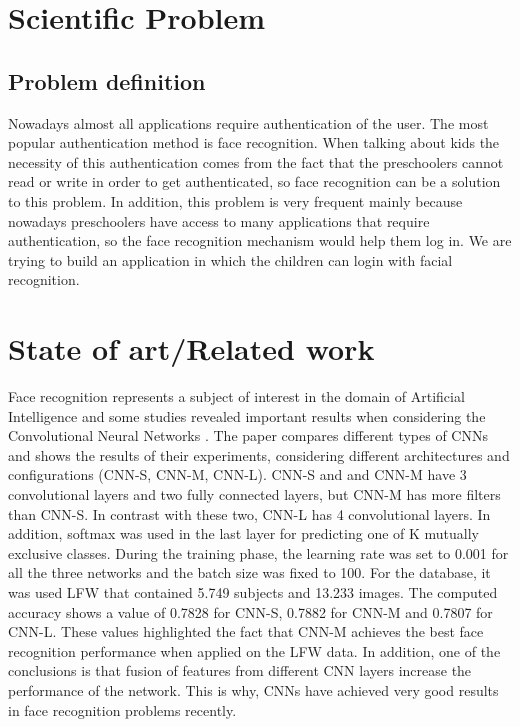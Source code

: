 \documentclass[runningheads,a4paper,11pt]{report}
\begin{document}
\chapter{Scientific Problem}
\label{section:scientificProblem}


\section{Problem definition}
\label{section:problemDefinition}
Nowadays almost all applications require authentication of the user. The most popular authentication method is face recognition. When talking about kids the necessity of this authentication comes from the fact that the preschoolers cannot read or write in order to get authenticated, so face recognition can be a solution to this problem. In addition, this problem is very frequent mainly because nowadays preschoolers have access to many applications that require authentication, so the face recognition mechanism would help them log in.
We are trying to build an application in which the children can login with facial recognition.



\chapter{State of art/Related work}
\label{chapter:stateOfArt}

Face recognition represents a subject of interest in the domain of Artificial Intelligence and some studies revealed important results when considering the Convolutional Neural Networks \cite{hu2015face}. The paper compares different types of CNNs and shows the results of their experiments, considering different architectures and configurations (CNN-S, CNN-M, CNN-L). CNN-S and and CNN-M have 3 convolutional layers and two fully connected layers, but CNN-M has more filters than CNN-S. In contrast with these two, CNN-L has 4 convolutional layers.  In addition, softmax was used in the last layer for predicting one of K mutually exclusive classes. During the training phase, the learning rate was set to 0.001 for all the three networks and the batch size was fixed to 100. For the database, it was used LFW that contained 5.749 subjects and 13.233 images. The computed accuracy shows a value of 0.7828 for CNN-S, 0.7882 for CNN-M and 0.7807 for CNN-L. These values highlighted the fact that CNN-M achieves the best face recognition performance when applied on the LFW data. In addition, one of the conclusions is that fusion of features from different CNN layers increase the performance of the network. This is why, CNNs have achieved very good results in face recognition problems recently.
\end{document}
